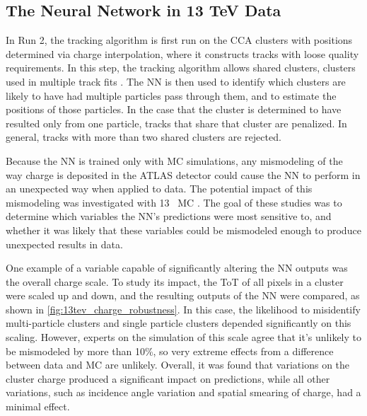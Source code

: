\subsection{The Neural Network in 13 TeV Data}

In Run 2, the tracking algorithm is first run on the \ac{CCA} clusters with positions determined via charge interpolation, where it constructs tracks with loose quality requirements. In this step, the tracking algorithm allows shared clusters, clusters used in multiple track fits \cite{ATL-PHYS-PUB-2015-044}. The \ac{NN} is then used to identify which clusters are likely to have had multiple particles pass through them, and to estimate the positions of those particles. In the case that the cluster is determined to have resulted only from one particle, tracks that share that cluster are penalized. In general, tracks with more than two shared clusters are rejected.

Because the \ac{NN} is trained only with \ac{MC} simulations, any mismodeling of the way charge is deposited in the ATLAS detector could cause the \ac{NN} to perform in an unexpected way when applied to data. The potential impact of this mismodeling was investigated with 13 \tev~\ac{MC} \cite{ATL-PHYS-PUB-2015-052}. The goal of these studies was to determine which variables the \ac{NN}'s predictions were most sensitive to, and whether it was likely that these variables could be mismodeled enough to produce unexpected results in data. 

One example of a variable capable of significantly altering the \ac{NN} outputs was the overall charge scale. To study its impact, the \ac{ToT} of all pixels in a cluster were scaled up and down, and the resulting outputs of the \ac{NN} were compared, as shown in \autoref{fig:13tev_charge_robustness}. In this case, the likelihood to misidentify multi-particle clusters and single particle clusters depended significantly on this scaling. However, experts on the simulation of this scale agree that it's unlikely to be mismodeled by more than 10\%, so very extreme effects from a difference between data and \ac{MC} are unlikely. Overall, it was found that variations on the cluster charge produced a significant impact on predictions, while all other variations, such as incidence angle variation and spatial smearing of charge, had a minimal effect. 

